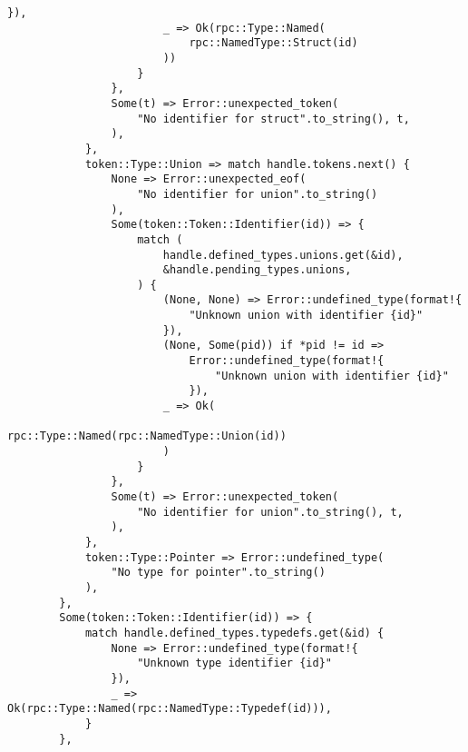 \begin{lstlisting}[caption={Разбор типа (часть 3)}, label={lst:rust_parser_type3}]
                            }),
                        _ => Ok(rpc::Type::Named(
                            rpc::NamedType::Struct(id)
                        ))
                    }
                },
                Some(t) => Error::unexpected_token(
                    "No identifier for struct".to_string(), t,
                ),
            },
            token::Type::Union => match handle.tokens.next() {
                None => Error::unexpected_eof(
                    "No identifier for union".to_string()
                ),
                Some(token::Token::Identifier(id)) => {
                    match (
                        handle.defined_types.unions.get(&id),
                        &handle.pending_types.unions,
                    ) {
                        (None, None) => Error::undefined_type(format!{
                            "Unknown union with identifier {id}"
                        }),
                        (None, Some(pid)) if *pid != id =>
                            Error::undefined_type(format!{
                                "Unknown union with identifier {id}"
                            }),
                        _ => Ok(
                            rpc::Type::Named(rpc::NamedType::Union(id))
                        )
                    }
                },
                Some(t) => Error::unexpected_token(
                    "No identifier for union".to_string(), t,
                ),
            },
            token::Type::Pointer => Error::undefined_type(
                "No type for pointer".to_string()
            ),
        },
        Some(token::Token::Identifier(id)) => {
            match handle.defined_types.typedefs.get(&id) {
                None => Error::undefined_type(format!{
                    "Unknown type identifier {id}"
                }),
                _ => Ok(rpc::Type::Named(rpc::NamedType::Typedef(id))),
            }
        },
\end{lstlisting}
\clearpage
